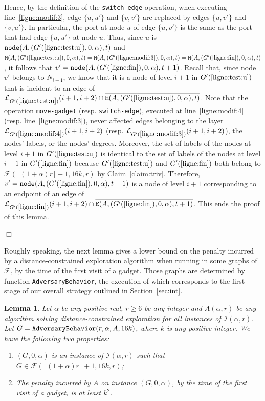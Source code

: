 \documentclass[11pt]{article}
\newtheorem{lemma}{Lemma}[section]
\newcommand{\qed}{\hfill $\Box$ \bigbreak}
\newenvironment{proof}{\noindent {\bf Proof.}}{\qed}
\begin{document}
{\begin{proof}
Hence, by the definition of the {\tt switch\mbox{-}edge} operation, when executing line~\ref{ligne:modif:3}, edge $\{u,u'\}$ and $\{v,v'\}$ are replaced by edges $\{u,v'\}$ and $\{v,u'\}$. In particular, the port at node $u$ of edge $\{u,v'\}$ is the same as the port that had edge $\{u,u'\}$ at node $u$. Thus, since $u$ is ${\tt node}(A,(G'(\ref{ligne:test:u}),0,\alpha),t)$ and ${\tt M}(A,(G'({\ref{ligne:test:u}}),0,\alpha),t)={\tt M}(A,(G'({\ref{ligne:modif:3}}),0,\alpha),t)={\tt M}(A,(G'({\ref{ligne:fin}}),0,\alpha),t)$, it follows that $v'={\tt node}(A,(G'(\ref{ligne:fin}),0,\alpha),t+1)$. Recall that, since node $v'$ belongs to $N_{i+1}$, we know that it is a node of level $i+1$ in $G'(\ref{ligne:test:u})$ that is incident to an edge of $\mathcal{L}_{G'(\ref{ligne:test:u})}(i+1,i+2)\cap\overline{{\tt E}(A,(G'(\ref{ligne:test:u}),0,\alpha),t)}$. Note that the operation {\tt move\mbox{-}gadget}  (resp. {\tt switch\mbox{-}edge}), executed at line~\ref{ligne:modif:4} (resp. line~\ref{ligne:modif:3}), never affected edges belonging to the layer $\mathcal{L}_{G'(\ref{ligne:modif:4})}(i+1,i+2)$ (resp. $\mathcal{L}_{G'(\ref{ligne:modif:3})}(i+1,i+2)$), the nodes' labels, or the nodes' degrees. Moreover, the set of labels of the nodes at level $i+1$ in
  $G'(\ref{ligne:test:u})$ is identical to the set of labels of the nodes at level
  $i+1$ in $G'(\ref{ligne:fin})$ because $G'(\ref{ligne:test:u})$ and $G'(\ref{ligne:fin})$ both belong to $\mathcal{F}(\lfloor(1+\alpha)r\rfloor+1,16k,r)$ by Claim~\ref{claim:triv}. Therefore, $v'={\tt node}(A,(G'(\ref{ligne:fin}),0,\alpha),t+1)$ is a node of level $i+1$ corresponding to an endpoint of an edge of $\mathcal{L}_{G'(\ref{ligne:fin})}(i+1,i+2)\cap\overline{{\tt E}(A,(G'(\ref{ligne:fin}),0,\alpha),t+1)}$. This ends the proof of this lemma.

\end{proof}

Roughly speaking, the next lemma gives a lower bound on the penalty incurred by a distance-constrained exploration algorithm when running in some graphs of $\mathcal{F}$, by the time of the first visit of a gadget. Those graphs are determined by function {\tt AdversaryBehavior}, the execution of which corresponds to the first stage of our overall strategy outlined in Section~\ref{sec:int}.

\begin{lemma}
\label{lem:penagadget}
Let $\alpha$ be any positive real, $r\geq 6$ be any integer and $A(\alpha,r)$ be any algorithm solving distance-constrained exploration for all instances of $\mathcal{I}(\alpha,r)$. Let $G={\tt AdversaryBehavior}(r,\alpha,A,16k)$, where $k$ is any positive integer. We have the following two properties:  
\begin{enumerate}
\item $(G,0,\alpha)$ is an instance of $\mathcal{I}(\alpha,r)$ such that $G\in\mathcal{F}(\lfloor(1+\alpha)r\rfloor+1,16k,r)$;
\item The penalty incurred by $A$ on instance $(G,0,\alpha)$, by the time of the first visit of a gadget, is at least $k^2$.
\end{enumerate}
\end{lemma}

}
\end{document}
